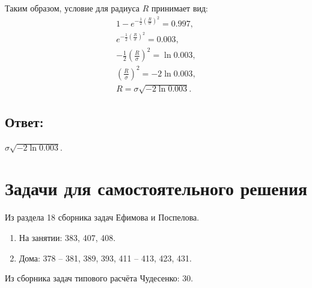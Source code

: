 Таким образом, условие для радиуса $R$ принимает вид:
\begin{gather}
    1 - e^{-\frac{1}{2} \left ( \frac{R}{\sigma} \right )^2} = 0.997 , \\
    e^{-\frac{1}{2} \left ( \frac{R}{\sigma} \right )^2} = 0.003 , \\
    -\frac{1}{2} \left ( \frac{R}{\sigma} \right )^2 = \ln 0.003 , \\
    \left ( \frac{R}{\sigma} \right )^2 = - 2 \ln 0.003 , \\
    R = \sigma \sqrt{- 2 \ln 0.003} .
\end{gather}

\subsection*{Ответ:}
$\sigma \sqrt{-2 \ln 0.003}$.

\section*{Задачи для самостоятельного решения}

Из раздела 18 сборника задач Ефимова и Поспелова.
\begin{enumerate}
    \item На занятии: 383, 407, 408.
    \item Дома: 378 -- 381, 389, 393, 411 -- 413, 423, 431.
\end{enumerate}

Из сборника задач типового расчёта Чудесенко: 30.